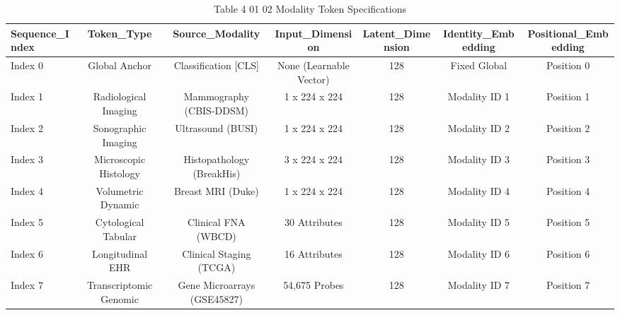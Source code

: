 \begin{table}[htbp]
\centering
\small
\begin{tabular}{lcccccc}
\hline
Sequence\_Index & Token\_Type & Source\_Modality & Input\_Dimension & Latent\_Dimension & Identity\_Embedding & Positional\_Embedding \\
\hline
Index 0 & Global Anchor & Classification [CLS] & None (Learnable Vector) & 128 & Fixed Global & Position 0 \\
Index 1 & Radiological Imaging & Mammography (CBIS-DDSM) & 1 x 224 x 224 & 128 & Modality ID 1 & Position 1 \\
Index 2 & Sonographic Imaging & Ultrasound (BUSI) & 1 x 224 x 224 & 128 & Modality ID 2 & Position 2 \\
Index 3 & Microscopic Histology & Histopathology (BreakHis) & 3 x 224 x 224 & 128 & Modality ID 3 & Position 3 \\
Index 4 & Volumetric Dynamic & Breast MRI (Duke) & 1 x 224 x 224 & 128 & Modality ID 4 & Position 4 \\
Index 5 & Cytological Tabular & Clinical FNA (WBCD) & 30 Attributes & 128 & Modality ID 5 & Position 5 \\
Index 6 & Longitudinal EHR & Clinical Staging (TCGA) & 16 Attributes & 128 & Modality ID 6 & Position 6 \\
Index 7 & Transcriptomic Genomic & Gene Microarrays (GSE45827) & 54,675 Probes & 128 & Modality ID 7 & Position 7 \\
\hline
\end{tabular}
\caption{Table 4 01 02 Modality Token Specifications}
\label{tab:table_4_01_02_modality_token_specifications}
\end{table}
